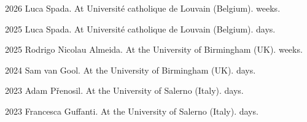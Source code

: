 
\chronorow
  {2026}
  {{Luca Spada}.}
  {At Université catholique de Louvain (Belgium).  weeks.}

\chronorow
  {2025}
  {{Luca Spada}.}
  {At Université catholique de Louvain (Belgium).  days.}

\chronorow
  {2025}
  {{Rodrigo Nicolau Almeida}.}
  {At the University of Birmingham (UK).  weeks.}

\chronorow
  {2024}
  {{Sam van Gool}.}
  {At the University of Birmingham (UK).  days.}

\chronorow
  {2023}
  {{Adam Přenosil}.}
  {At the University of Salerno (Italy).  days.}

\chronorow
  {2023}
  {{Francesca Guffanti}.}
  {At the University of Salerno (Italy).  days.}
